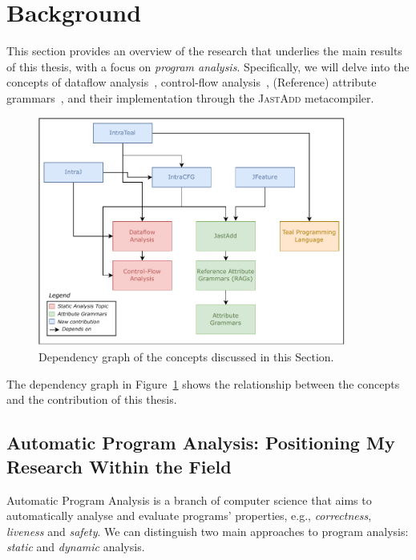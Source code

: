 \section{Background}
\label{sec:background}
This section provides an overview of the research that underlies the main results
of this thesis, with a focus on \emph{program analysis}. Specifically, we will delve into
the concepts of dataflow analysis~\cite{aho2007compilers,Nielson2010Principles},
control-flow analysis~\cite{allen1970control}, (Reference) attribute grammars~\cite{knuth1968semantics, DBLP:journals/informaticaSI/Hedin00},
and their implementation through the \textsc{JastAdd} metacompiler.

\usetikzlibrary{backgrounds}
\begin{figure}[h]
    \centering
    \includegraphics[width=0.9\textwidth]{kappa/img/Dependencies.pdf}
  \caption{\label{fig:dependencygraph}Dependency graph of the concepts discussed in this Section.}
\end{figure}
The dependency graph in Figure~\ref{fig:dependencygraph} shows the relationship between
the concepts and the contribution of this thesis.

\subsection{Automatic Program Analysis: Positioning My Research Within the Field}
Automatic Program Analysis is a branch of computer science that aims to automatically
analyse and evaluate programs' properties, e.g., \emph{correctness}, \emph{liveness} and \emph{safety}. We can distinguish two main
approaches to program analysis: \emph{static} and \emph{dynamic} analysis.

